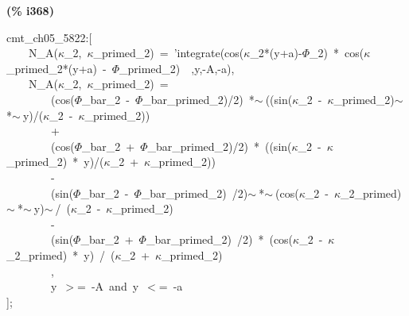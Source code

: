 \documentclass[fleqn]{article}
\begin{document}
\noindent
\begin{minipage}[t]{4.000000em}\color{red}\bfseries
(\% i368)	
\end{minipage}
\begin{minipage}[t]{\textwidth}\color{blue}
cmt\_ch05\_5822:[\\
\ \ \ \ N\_A(\ensuremath{\kappa}\_2,\ \ensuremath{\kappa}\_primed\_2)\ =\ 'integrate(cos(\ensuremath{\kappa}\_2*(y+a)-\ensuremath{\Phi}\_2)\ *\ cos(\ensuremath{\kappa}\_primed\_2*(y+a)\ -\ \ensuremath{\Phi}\_primed\_2)\ \ ,y,-A,-a),\\
\ \ \ \ N\_A(\ensuremath{\kappa}\_2,\ \ensuremath{\kappa}\_primed\_2)\ =\ \\
\ \ \ \ \ \ \ \ (cos(\ensuremath{\Phi}\_bar\_2\ -\ \ensuremath{\Phi}\_bar\_primed\_2)/2)\ *\ensuremath{\sim\ }((sin(\ensuremath{\kappa}\_2\ -\ \ensuremath{\kappa}\_primed\_2)\ensuremath{\sim\ }*\ensuremath{\sim\ }y)/(\ensuremath{\kappa}\_2\ -\ \ensuremath{\kappa}\_primed\_2))\\
\ \ \ \ \ \ \ \ +\ \\
\ \ \ \ \ \ \ \ (cos(\ensuremath{\Phi}\_bar\_2\ +\ \ensuremath{\Phi}\_bar\_primed\_2)/2)\ *\ ((sin(\ensuremath{\kappa}\_2\ -\ \ensuremath{\kappa}\_primed\_2)\ *\ y)/(\ensuremath{\kappa}\_2\ +\ \ensuremath{\kappa}\_primed\_2))\\
\ \ \ \ \ \ \ \ -\\
\ \ \ \ \ \ \ \ (sin(\ensuremath{\Phi}\_bar\_2\ -\ \ensuremath{\Phi}\_bar\_primed\_2)\ /2)\ensuremath{\sim\ }*\ensuremath{\sim\ }(cos(\ensuremath{\kappa}\_2\ -\ \ensuremath{\kappa}\_2\_primed)\ensuremath{\sim\ }*\ensuremath{\sim\ }y)\ensuremath{\sim\ }/\ (\ensuremath{\kappa}\_2\ -\ \ensuremath{\kappa}\_primed\_2)\\
\ \ \ \ \ \ \ \ -\\
\ \ \ \ \ \ \ \ (sin(\ensuremath{\Phi}\_bar\_2\ +\ \ensuremath{\Phi}\_bar\_primed\_2)\ /2)\ *\ (cos(\ensuremath{\kappa}\_2\ -\ \ensuremath{\kappa}\_2\_primed)\ *\ y)\ /\ (\ensuremath{\kappa}\_2\ +\ \ensuremath{\kappa}\_primed\_2)\\
\ \ \ \ \ \ \ \ ,\\
\ \ \ \ \ \ \ \ y\ \ensuremath{>}=\ -A\ and\ y\ \ensuremath{<}=\ -a\\
];
\end{minipage}
\end{document}
